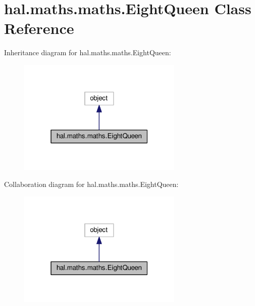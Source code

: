 \hypertarget{classhal_1_1maths_1_1maths_1_1_eight_queen}{}\section{hal.\+maths.\+maths.\+Eight\+Queen Class Reference}
\label{classhal_1_1maths_1_1maths_1_1_eight_queen}


Inheritance diagram for hal.\+maths.\+maths.\+Eight\+Queen\+:\nopagebreak
\begin{figure}[H]
\begin{center}
\leavevmode
\includegraphics[width=223pt]{classhal_1_1maths_1_1maths_1_1_eight_queen__inherit__graph}
\end{center}
\end{figure}


Collaboration diagram for hal.\+maths.\+maths.\+Eight\+Queen\+:\nopagebreak
\begin{figure}[H]
\begin{center}
\leavevmode
\includegraphics[width=223pt]{classhal_1_1maths_1_1maths_1_1_eight_queen__coll__graph}
\end{center}
\end{figure}
